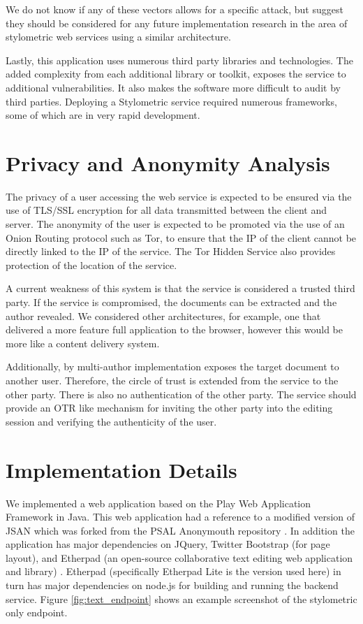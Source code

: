 \documentclass[letterpaper]{article}
\begin{document}
We do not know if any of these vectors allows for a specific
attack, but suggest they should be considered for any future
implementation research in the area of stylometric web services using
a similar architecture.

Lastly, this application uses numerous third party libraries and
technologies.  The added complexity from each additional library or
toolkit, exposes the service to additional vulnerabilities.  It also
makes the software more difficult to audit by third parties.
Deploying a Stylometric service required numerous frameworks, some of
which are in very rapid development.

\section{Privacy and Anonymity Analysis}\label{sec:privacy}

The privacy of a user accessing the web service is expected to be
ensured via the use of TLS/SSL encryption for all data transmitted
between the client and server. The anonymity of the user is expected
to be promoted via the use of an Onion Routing protocol such as Tor,
to ensure that the IP of the client cannot be directly linked to the
IP of the service.  The Tor Hidden Service also provides protection of
the location of the service.

A current weakness of this system is that the service is considered a
trusted third party.  If the service is compromised, the documents can
be extracted and the author revealed.  We considered other
architectures, for example, one that delivered a more feature full
application to the browser, however this would be more like a content
delivery system.

Additionally, by multi-author implementation exposes the target
document to another user.  Therefore, the circle of trust is extended
from the service to the other party.  There is also no authentication
of the other party.  The service should provide an OTR like mechanism
for inviting the other party into the editing session and verifying
the authenticity of the user.


\section{Implementation Details}\label{sec:impl}

We implemented a web application based on the Play Web Application
Framework in Java. This web application had a reference to a modified
version of JSAN which was forked from the PSAL Anonymouth repository
\cite{PSAL:github}. In addition the application has major dependencies
on JQuery, Twitter Bootstrap (for page layout), and Etherpad (an
open-source collaborative text editing web application and library)
\cite{etherpad}. Etherpad (specifically Etherpad Lite is the version
used here) in turn has major dependencies on node.js for building and
running the backend service.  Figure \ref{fig:text_endpoint} shows an
example screenshot of the stylometric only endpoint.
\end{document}
